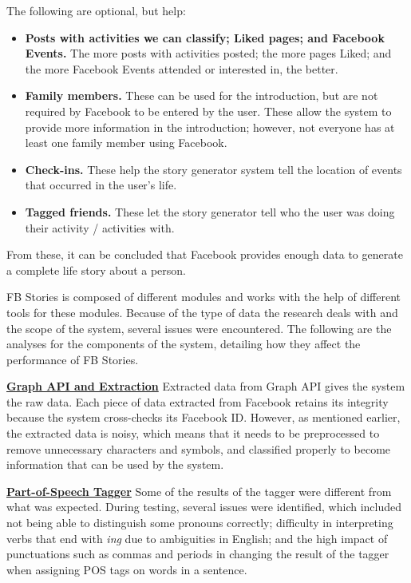 \begin{itemize}
	The following are optional, but help:
	\begin{itemize}
		\item \textbf{Posts with activities we can classify; Liked pages; and Facebook Events.} The more posts with activities posted; the more pages Liked; and the more Facebook Events attended or interested in, the better.
		\item \textbf{Family members.} These can be used for the introduction, but are not required by Facebook to be entered by the user. These allow the system to provide more information in the introduction; however, not everyone has at least one family member using Facebook.
		\item \textbf{Check-ins.} These help the story generator system tell the location of events that occurred in the user’s life.
		\item \textbf{Tagged friends.} These let the story generator tell who the user was doing their activity / activities with.
	\end{itemize}

	From these, it can be concluded that Facebook provides enough data to generate a complete life story about a person.
\end{itemize}

FB Stories is composed of different modules and works with the help of different tools for these modules. Because of the type of data the research deals with and the scope of the system, several issues were encountered. The following are the analyses for the components of the system, detailing how they affect the performance of FB Stories.

\underline{\textbf{Graph API and Extraction}} \newline
Extracted data from Graph API gives the system the raw data. Each piece of data extracted from Facebook retains its integrity because the system cross-checks its Facebook ID. However, as mentioned earlier, the extracted data is noisy, which means that it needs to be preprocessed to remove unnecessary characters and symbols, and classified properly to become information that can be used by the system.

\underline{\textbf{Part-of-Speech Tagger}} \newline
Some of the results of the tagger were different from what was expected. During testing, several issues were identified, which included not being able to distinguish some pronouns correctly; difficulty in interpreting verbs that end with \textit{ing} due to ambiguities in English; and the high impact of punctuations such as commas and periods in changing the result of the tagger when assigning POS tags on words in a sentence.

